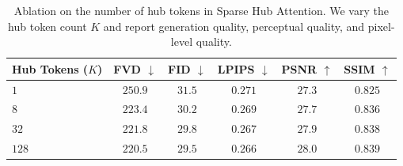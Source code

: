 \begin{table}[t]
  \centering
  \footnotesize
  \setlength{\belowcaptionskip}{10pt}%
  \caption{Ablation on the number of hub tokens in Sparse Hub Attention. We vary the hub token count $K$ and report generation quality, perceptual quality, and pixel-level quality.}%
  \label{tab:hub-token-ablation}%
  \vspace{4pt}%
  \setlength{\tabcolsep}{4pt}%
  \renewcommand{\arraystretch}{1.12}%
    \begin{tabular}{@{}lccccc@{}}
    \toprule
    \textbf{Hub Tokens ($K$)}
      & FVD $\downarrow$
      & FID $\downarrow$
      & LPIPS $\downarrow$
      & PSNR $\uparrow$
      & SSIM $\uparrow$ \\
    \midrule
    $1$
      & $250.9$ & $31.5$ & $0.271$ & $27.3$ & $0.825$ \\
    $8$
      & $223.4$ & $30.2$ & $0.269$ & $27.7$ & $0.836$ \\
    $32$
      & $221.8$ & $29.8$ & $0.267$ & $27.9$ & $0.838$ \\
    $128$
      & $220.5$ & $29.5$ & $0.266$ & $28.0$ & $0.839$ \\
    \bottomrule
  \end{tabular}
\end{table}
